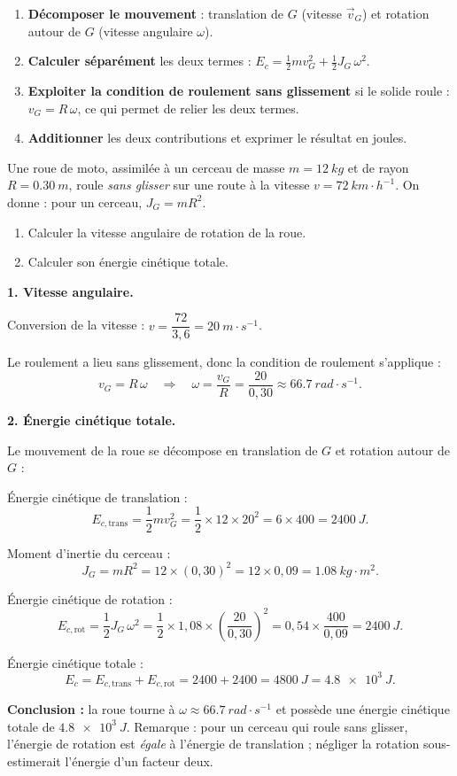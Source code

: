 \documentclass[11pt]{article}
\begin{document}
\begin{methode}
\begin{enumerate}
\item \textbf{Décomposer le mouvement} : translation de $G$ (vitesse $\vec{v}_G$) et rotation autour de $G$ (vitesse angulaire $\omega$).
\item \textbf{Calculer séparément} les deux termes : $E_c = \frac{1}{2}mv_G^2 + \frac{1}{2}J_G\,\omega^2$.
\item \textbf{Exploiter la condition de roulement sans glissement} si le solide roule : $v_G = R\,\omega$, ce qui permet de relier les deux termes.
\item \textbf{Additionner} les deux contributions et exprimer le résultat en joules.
\end{enumerate}
\end{methode}

\begin{exoresolu}
Une roue de moto, assimilée à un cerceau de masse $m = \SI{12}{kg}$ et de rayon $R = \SI{0,30}{m}$, roule \emph{sans glisser} sur une route à la vitesse $v = \SI{72}{km\cdot h^{-1}}$. On donne : pour un cerceau, $J_G = mR^2$.
\begin{enumerate}
\item Calculer la vitesse angulaire de rotation de la roue.
\item Calculer son énergie cinétique totale.
\end{enumerate}
\tcblower
\textbf{1. Vitesse angulaire.}

Conversion de la vitesse : $v = \dfrac{72}{3,6} = \SI{20}{m\cdot s^{-1}}$.

Le roulement a lieu sans glissement, donc la condition de roulement s'applique :
\[ v_G = R\,\omega \quad\Longrightarrow\quad \omega = \frac{v_G}{R} = \frac{20}{0,30} \approx \SI{66,7}{rad\cdot s^{-1}}. \]

\textbf{2. Énergie cinétique totale.}

Le mouvement de la roue se décompose en translation de $G$ et rotation autour de $G$ :

Énergie cinétique de translation :
\[ E_{c,\mathrm{trans}} = \frac{1}{2}mv_G^2 = \frac{1}{2}\times 12 \times 20^2 = 6 \times 400 = \SI{2400}{J}. \]

Moment d'inertie du cerceau :
\[ J_G = mR^2 = 12 \times (0,30)^2 = 12 \times 0,09 = \SI{1,08}{kg\cdot m^2}. \]

Énergie cinétique de rotation :
\[ E_{c,\mathrm{rot}} = \frac{1}{2}J_G\,\omega^2 = \frac{1}{2}\times 1,08 \times \left(\frac{20}{0,30}\right)^2 = 0,54 \times \frac{400}{0,09} = \SI{2400}{J}. \]

Énergie cinétique totale :
\[ E_c = E_{c,\mathrm{trans}} + E_{c,\mathrm{rot}} = 2400 + 2400 = \SI{4800}{J} = \SI{4,8e3}{J}. \]

\textbf{Conclusion :} la roue tourne à $\omega \approx \SI{66,7}{rad\cdot s^{-1}}$ et possède une énergie cinétique totale de $\SI{4,8e3}{J}$. Remarque : pour un cerceau qui roule sans glisser, l'énergie de rotation est \emph{égale} à l'énergie de translation ; négliger la rotation sous-estimerait l'énergie d'un facteur deux.
\end{exoresolu}
\end{document}
